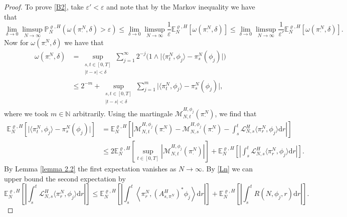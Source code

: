 \documentclass[11pt]{article}
\numberwithin{equation}{section}
\theoremstyle{definition}
\theoremstyle{plain}
\newcommand{\E}{\mathbb{E}}
\newcommand{\p}{\mathbb{P}}
\newcommand{\dd}{\mathrm{d}}
\newcommand{\nn}{\nonumber}
\begin{document}
\begin{proof}
To prove \ref{B2}, take $\varepsilon'<\varepsilon$ and  note  that by the Markov inequality we have that 
    \begin{equation}
        \lim_{\delta\to0}\limsup_{N\to\infty} \p^{\varrho,H}_N(\omega(\pi^N_{\cdot},\delta) > \varepsilon) \leq \lim_{\delta\to0}\limsup_{N\to\infty}\frac{1}{\varepsilon} \E^{\varrho,H}_N\left[\omega(\pi^N_{\cdot},\delta)\right] \leq \lim_{\delta\to0}\limsup_{N\to\infty}\frac{1}{\varepsilon'} \E^{\varrho,H}_N\left[\omega(\pi^N_{\cdot},\delta)\right].
    \end{equation}
Now for $\omega(\pi^N_{\cdot},\delta)$ we have that 
    \begin{align}
        \omega(\pi^N_{\cdot},\delta) 
        &= \sup_{\substack{s,t\in[0,T]\\|t-s|<\delta}}\sum_{j=1}^\infty 2^{-j}\Big(1\wedge \big|\langle \pi^N_{t},\phi_j\rangle - \pi^N_{s}(\phi_j)\big|\Big)\nn\\
        &\leq 2^{-m} + \sup_{\substack{s,t\in[0,T]\\|t-s|<\delta}}\sum_{j=1}^m \big|\langle \pi^N_{t},\phi_j\rangle - \pi^N_{s}(\phi_j)\big|,
    \end{align}
where we took $m\in\mathbb{N}$ arbitrarily. Using the martingale $\mathscr{M}_{N,t}^{H,\phi_j}(\pi^N_{\cdot})$, we find that 
    \begin{align}
        \E^{\varrho,H}_N\left[\big|\langle \pi^N_{t},\phi_j\rangle - \pi^N_{s}(\phi_j)\big|\right] 
        &= \E^{\varrho,H}_N\left[\left|\mathscr{M}_{N,t}^{H,\phi_j}(\pi^N_{\cdot}) - \mathscr{M}_{N,s}^{H,\phi_j}(\pi^N_{\cdot}) - \int_s^t \mathscr{L}^H_{N,s}\langle \pi^N_{r},\phi_j\rangle \dd r \right|\right]\nn\\
    &\leq 2\E^{\varrho,H}_N\left[\sup_{t\in[0,T]} \left|\mathscr{M}_{N,t}^{H,\phi_j}(\pi^N_{\cdot})\right|\right] + \E^{\varrho,H}_N\left[\left|\int_s^t \mathscr{L}^H_{N,s}\langle \pi^N_{r},\phi_j\rangle\dd r\right|\right].
    \end{align}
By Lemma \ref{lemma 2.2} the first expectation vanishes as $N\to\infty$. By \eqref{Ln} we can upper bound the second expectation by 
    \begin{equation}
        \E^{\varrho,H}_N\left[\left|\int_s^t \mathscr{L}^H_{N,s}\langle \pi^N_{r},\phi_j\rangle\dd r\right|\right] \leq \E^{\varrho,H}_N\left[\left|\int_s^t\left\langle \pi^N_{r}, \left(\!A^{H}_{s, \pi^N_\cdot}\!\right)^{\!*} \phi_j\right\rangle\dd r\right|\right] + \E^{\varrho,H}_N\left[\left|\int_s^t R(N,\phi_j,r)\dd r\right|\right].
    \end{equation}

\end{proof}
\end{document}
